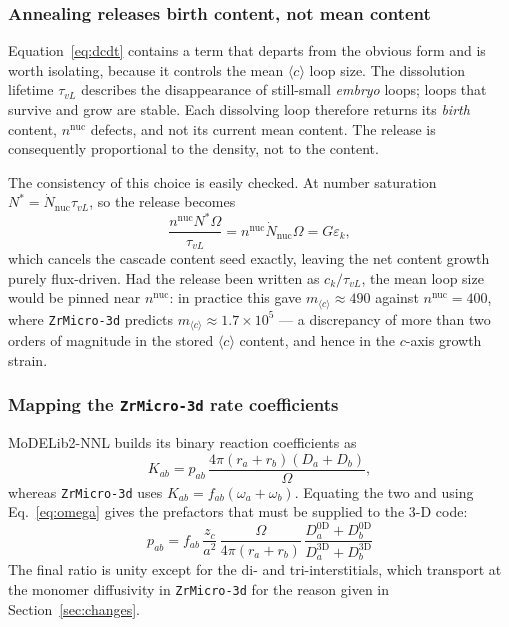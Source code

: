 \documentclass{article}
\newcommand{\cloop}{\ensuremath{\langle c\rangle}}
\newcommand{\ZrM}{\texttt{ZrMicro-3d}}
\newcommand{\MoD}{\textsf{MoDELib2-NNL}}
\begin{document}
\subsubsection{Annealing releases birth content, not mean content}

Equation~\eqref{eq:dcdt} contains a term that departs from the obvious form and
is worth isolating, because it controls the mean \cloop{} loop size. The
dissolution lifetime $\tau_{vL}$ describes the disappearance of still-small
\emph{embryo} loops; loops that survive and grow are stable. Each dissolving loop
therefore returns its \emph{birth} content, $n^{\text{nuc}}$ defects, and not its
current mean content. The release is consequently proportional to the density,
not to the content.

The consistency of this choice is easily checked. At number saturation
$N^\ast = \dot{N}_{\text{nuc}}\tau_{vL}$, so the release becomes
\begin{equation}
\frac{n^{\text{nuc}} N^\ast \Omega}{\tau_{vL}}
= n^{\text{nuc}} \dot{N}_{\text{nuc}} \Omega
= G\varepsilon_k ,
\end{equation}
which cancels the cascade content seed exactly, leaving the net content growth
purely flux-driven. Had the release been written as $c_k/\tau_{vL}$, the mean
loop size would be pinned near $n^{\text{nuc}}$: in practice this gave
$m_{\cloop} \approx 490$ against $n^{\text{nuc}} = 400$, where \ZrM{} predicts
$m_{\cloop} \approx 1.7\times 10^5$ --- a discrepancy of more than two orders of
magnitude in the stored \cloop{} content, and hence in the $c$-axis growth strain.

\subsubsection{Mapping the \ZrM{} rate coefficients}

\MoD{} builds its binary reaction coefficients as
\begin{equation}
K_{ab} = p_{ab}\,\frac{4\pi (r_a + r_b)(D_a + D_b)}{\Omega},
\label{eq:K3d}
\end{equation}
whereas \ZrM{} uses $K_{ab} = f_{ab}(\omega_a + \omega_b)$. Equating the two and
using Eq.~\eqref{eq:omega} gives the prefactors that must be supplied to the 3-D
code:
\begin{equation}
\boxed{\;
p_{ab} = f_{ab}\,\frac{z_c}{a^2}\,\frac{\Omega}{4\pi (r_a+r_b)}\,
\frac{D^{\text{0D}}_a + D^{\text{0D}}_b}{D^{\text{3D}}_a + D^{\text{3D}}_b}\;}
\label{eq:prefactor}
\end{equation}
The final ratio is unity except for the di- and tri-interstitials, which
transport at the monomer diffusivity in \ZrM{} for the reason given in
Section~\ref{sec:changes}.
\end{document}
